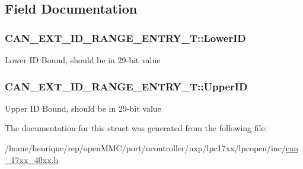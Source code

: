 \subsection{Field Documentation}
\hypertarget{structCAN__EXT__ID__RANGE__ENTRY__T_a704cb0823b253cecdb54c0cff24f5fac}{
\subsubsection[{Lower\-I\-D}]{ C\-A\-N\-\_\-\-E\-X\-T\-\_\-\-I\-D\-\_\-\-R\-A\-N\-G\-E\-\_\-\-E\-N\-T\-R\-Y\-\_\-\-T\-::\-Lower\-I\-D}}\label{structCAN__EXT__ID__RANGE__ENTRY__T_a704cb0823b253cecdb54c0cff24f5fac}
Lower I\-D Bound, should be in 29-\/bit value \hypertarget{structCAN__EXT__ID__RANGE__ENTRY__T_a6889adbc72854cce6891e7595a96bf3d}{
\subsubsection[{Upper\-I\-D}]{ C\-A\-N\-\_\-\-E\-X\-T\-\_\-\-I\-D\-\_\-\-R\-A\-N\-G\-E\-\_\-\-E\-N\-T\-R\-Y\-\_\-\-T\-::\-Upper\-I\-D}}\label{structCAN__EXT__ID__RANGE__ENTRY__T_a6889adbc72854cce6891e7595a96bf3d}
Upper I\-D Bound, should be in 29-\/bit value 

The documentation for this struct was generated from the following file\-:\begin{DoxyCompactItemize}
\item 
/home/henrique/rep/open\-M\-M\-C/port/ucontroller/nxp/lpc17xx/lpcopen/inc/\hyperlink{can__17xx__40xx_8h}{can\-\_\-17xx\-\_\-40xx.\-h}\end{DoxyCompactItemize}
